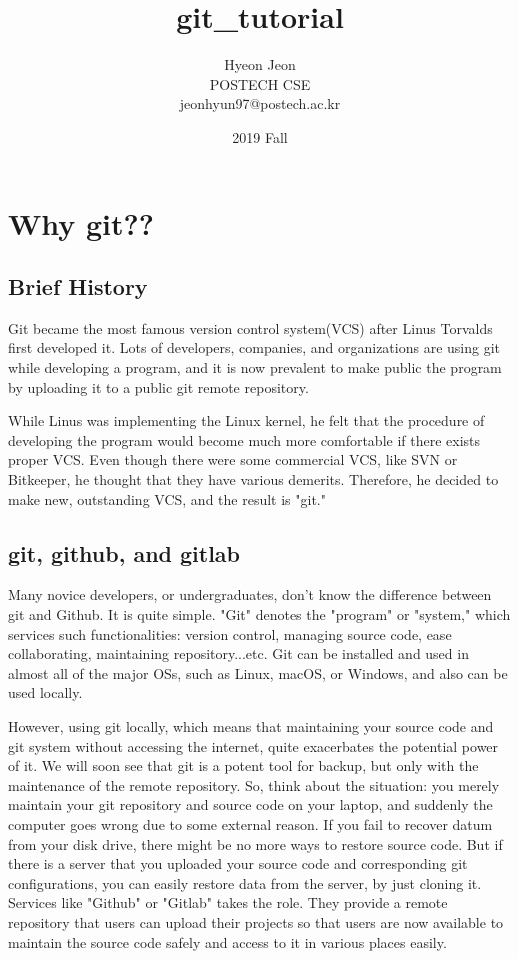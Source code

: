 \documentclass{oblivoir}
\title{\Huge{git\_tutorial}}
\author{Hyeon Jeon \\ POSTECH CSE\\ \small{jeonhyun97@postech.ac.kr}  
        }
\date{\small{2019 Fall}}
\begin{document}

\maketitle

\section{Why git??}

\subsection{Brief History}

Git became the most famous version control system(VCS) after Linus Torvalds first developed it. Lots of developers, companies, and organizations are using git while developing a program, and it is now prevalent to make public the program by uploading it to a public git remote repository. 

While Linus was implementing the Linux kernel, he felt that the procedure of developing the program would become much more comfortable if there exists proper VCS. Even though there were some commercial VCS, like SVN or Bitkeeper, he thought that they have various demerits. Therefore, he decided to make new, outstanding VCS, and the result is "git." 

\subsection{git, github, and gitlab}

Many novice developers, or undergraduates, don't know the difference between git and Github. It is quite simple. "Git" denotes the "program" or "system," which services such functionalities: version control, managing source code, ease collaborating, maintaining repository...etc. Git can be installed and used in almost all of the major OSs, such as Linux, macOS, or Windows, and also can be used locally. 

However, using git locally, which means that maintaining your source code and git system without accessing the internet, quite exacerbates the potential power of it. We will soon see that git is a potent tool for backup, but only with the maintenance of the remote repository. So, think about the situation: you merely maintain your git repository and source code on your laptop, and suddenly the computer goes wrong due to some external reason. If you fail to recover datum from your disk drive, there might be no more ways to restore source code. But if there is a server that you uploaded your source code and corresponding git configurations, you can easily restore data from the server, by just cloning it.  Services like "Github" or "Gitlab" takes the role. They provide a remote repository that users can upload their projects so that users are now available to maintain the source code safely and access to it in various places easily.  
\end{document}
